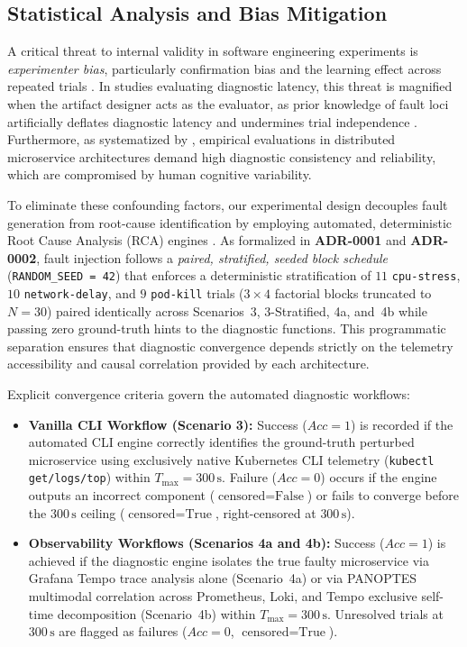 \subsection{Statistical Analysis and Bias Mitigation}
\label{subsec:statistical-analysis}

A critical threat to internal validity in software engineering experiments is \textit{experimenter bias}, particularly confirmation bias and the learning effect across repeated trials \cite{wohlin_2012}. In studies evaluating diagnostic latency, this threat is magnified when the artifact designer acts as the evaluator, as prior knowledge of fault loci artificially deflates diagnostic latency and undermines trial independence \cite{sjoberg_2007, wang_2024}. Furthermore, as systematized by \cite{barata_2026}, empirical evaluations in distributed microservice architectures demand high diagnostic consistency and reliability, which are compromised by human cognitive variability.

To eliminate these confounding factors, our experimental design decouples fault generation from root-cause identification by employing automated, deterministic Root Cause Analysis (RCA) engines \cite{wang_2024, barata_2026}. As formalized in \textbf{ADR-0001} and \textbf{ADR-0002}, fault injection follows a \textit{paired, stratified, seeded block schedule} (\texttt{RANDOM\_SEED = 42}) that enforces a deterministic stratification of $11$ \texttt{cpu-stress}, $10$ \texttt{network-delay}, and $9$ \texttt{pod-kill} trials ($3 \times 4$ factorial blocks truncated to $N=30$) paired identically across Scenarios~3, 3-Stratified, 4a, and~4b while passing zero ground-truth hints to the diagnostic functions. This programmatic separation ensures that diagnostic convergence depends strictly on the telemetry accessibility and causal correlation provided by each architecture.

Explicit convergence criteria govern the automated diagnostic workflows:

\begin{itemize}
    \item \textbf{Vanilla CLI Workflow (Scenario 3):} Success ($Acc = 1$) is recorded if the automated CLI engine correctly identifies the ground-truth perturbed microservice using exclusively native Kubernetes CLI telemetry (\texttt{kubectl get/logs/top}) within $T_{\text{max}} = 300\,\text{s}$. Failure ($Acc = 0$) occurs if the engine outputs an incorrect component ($\text{censored} = \text{False}$) or fails to converge before the $300\,\text{s}$ ceiling ($\text{censored} = \text{True}$, right-censored at $300\,\text{s}$).
    
    \item \textbf{Observability Workflows (Scenarios 4a and 4b):} Success ($Acc = 1$) is achieved if the diagnostic engine isolates the true faulty microservice via Grafana Tempo trace analysis alone (Scenario~4a) or via PANOPTES multimodal correlation across Prometheus, Loki, and Tempo exclusive self-time decomposition (Scenario~4b) within $T_{\text{max}} = 300\,\text{s}$. Unresolved trials at $300\,\text{s}$ are flagged as failures ($Acc = 0$, $\text{censored} = \text{True}$).
\end{itemize}

